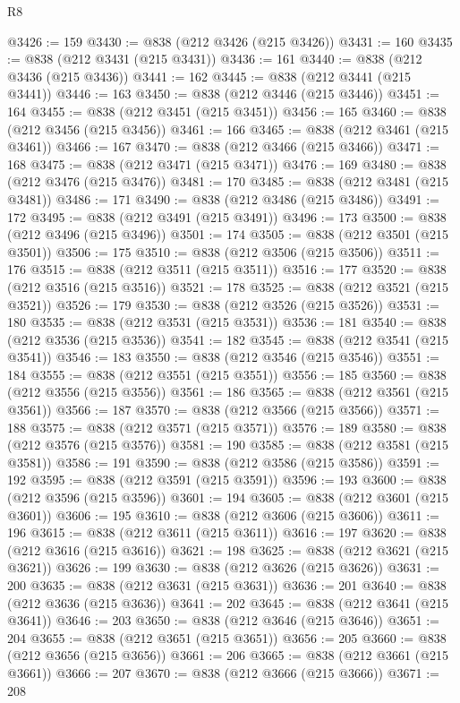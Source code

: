 \begin{lexlean}{R8}
\begin{coremodule}
@3426 := 159
@3430 := @838 (@212 @3426 (@215 @3426))
@3431 := 160
@3435 := @838 (@212 @3431 (@215 @3431))
@3436 := 161
@3440 := @838 (@212 @3436 (@215 @3436))
@3441 := 162
@3445 := @838 (@212 @3441 (@215 @3441))
@3446 := 163
@3450 := @838 (@212 @3446 (@215 @3446))
@3451 := 164
@3455 := @838 (@212 @3451 (@215 @3451))
@3456 := 165
@3460 := @838 (@212 @3456 (@215 @3456))
@3461 := 166
@3465 := @838 (@212 @3461 (@215 @3461))
@3466 := 167
@3470 := @838 (@212 @3466 (@215 @3466))
@3471 := 168
@3475 := @838 (@212 @3471 (@215 @3471))
@3476 := 169
@3480 := @838 (@212 @3476 (@215 @3476))
@3481 := 170
@3485 := @838 (@212 @3481 (@215 @3481))
@3486 := 171
@3490 := @838 (@212 @3486 (@215 @3486))
@3491 := 172
@3495 := @838 (@212 @3491 (@215 @3491))
@3496 := 173
@3500 := @838 (@212 @3496 (@215 @3496))
@3501 := 174
@3505 := @838 (@212 @3501 (@215 @3501))
@3506 := 175
@3510 := @838 (@212 @3506 (@215 @3506))
@3511 := 176
@3515 := @838 (@212 @3511 (@215 @3511))
@3516 := 177
@3520 := @838 (@212 @3516 (@215 @3516))
@3521 := 178
@3525 := @838 (@212 @3521 (@215 @3521))
@3526 := 179
@3530 := @838 (@212 @3526 (@215 @3526))
@3531 := 180
@3535 := @838 (@212 @3531 (@215 @3531))
@3536 := 181
@3540 := @838 (@212 @3536 (@215 @3536))
@3541 := 182
@3545 := @838 (@212 @3541 (@215 @3541))
@3546 := 183
@3550 := @838 (@212 @3546 (@215 @3546))
@3551 := 184
@3555 := @838 (@212 @3551 (@215 @3551))
@3556 := 185
@3560 := @838 (@212 @3556 (@215 @3556))
@3561 := 186
@3565 := @838 (@212 @3561 (@215 @3561))
@3566 := 187
@3570 := @838 (@212 @3566 (@215 @3566))
@3571 := 188
@3575 := @838 (@212 @3571 (@215 @3571))
@3576 := 189
@3580 := @838 (@212 @3576 (@215 @3576))
@3581 := 190
@3585 := @838 (@212 @3581 (@215 @3581))
@3586 := 191
@3590 := @838 (@212 @3586 (@215 @3586))
@3591 := 192
@3595 := @838 (@212 @3591 (@215 @3591))
@3596 := 193
@3600 := @838 (@212 @3596 (@215 @3596))
@3601 := 194
@3605 := @838 (@212 @3601 (@215 @3601))
@3606 := 195
@3610 := @838 (@212 @3606 (@215 @3606))
@3611 := 196
@3615 := @838 (@212 @3611 (@215 @3611))
@3616 := 197
@3620 := @838 (@212 @3616 (@215 @3616))
@3621 := 198
@3625 := @838 (@212 @3621 (@215 @3621))
@3626 := 199
@3630 := @838 (@212 @3626 (@215 @3626))
@3631 := 200
@3635 := @838 (@212 @3631 (@215 @3631))
@3636 := 201
@3640 := @838 (@212 @3636 (@215 @3636))
@3641 := 202
@3645 := @838 (@212 @3641 (@215 @3641))
@3646 := 203
@3650 := @838 (@212 @3646 (@215 @3646))
@3651 := 204
@3655 := @838 (@212 @3651 (@215 @3651))
@3656 := 205
@3660 := @838 (@212 @3656 (@215 @3656))
@3661 := 206
@3665 := @838 (@212 @3661 (@215 @3661))
@3666 := 207
@3670 := @838 (@212 @3666 (@215 @3666))
@3671 := 208

\end{coremodule}
\end{lexlean}
